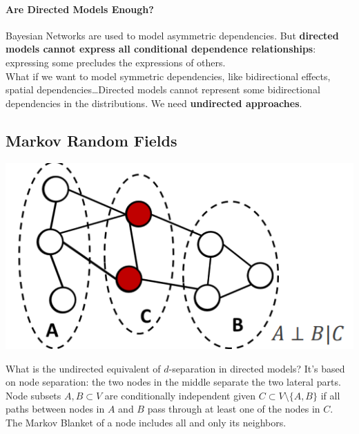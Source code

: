 \documentclass[10pt]{report}
\begin{document}
\paragraph{Are Directed Models Enough?} Bayesian Networks are used to model asymmetric dependencies. But \textbf{directed models cannot express all conditional dependence relationships}: expressing some precludes the expressions of others.\\
What if we want to model symmetric dependencies, like bidirectional effects, spatial dependencies\ldots Directed models cannot represent some bidirectional dependencies in the distributions. We need \textbf{undirected approaches}.
\subsection{Markov Random Fields}\begin{center}
	\includegraphics[scale=0.5]{24.png}
\end{center}
What is the undirected equivalent of $d$-separation in directed models? It's based on node separation: the two nodes in the middle separate the two lateral parts.\\
Node subsets $A,B\subset V$ are conditionally independent given $C\subset V\setminus \{A,B\}$ if all paths between nodes in $A$ and $B$ pass through at least one of the nodes in $C$.\\
The Markov Blanket of a node includes all and only its neighbors.
\end{document}
